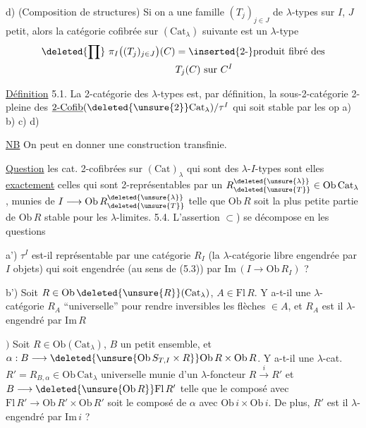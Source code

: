 d)  (Composition de structures) Si on a une
famille $(T_j)_{j\in J}$ de $\lambda$-types sur $I$, $J$ petit,
 alors la catégorie cofibrée sur $(\mathrm{Cat}_{\lambda})$
suivante est un $\lambda$-type
\[
\begin{aligned}
\deleted{\prod}\ \pi_I\bigl((T_j)_{j\in J}\bigr)(C)&=\inserted{2\text{-}}\text{produit fibré des}\\
&T_j(C)\text{ sur }C^I
\end{aligned}
\]

\uline{Définition} 5.1. La 2-catégorie des $\lambda$-types est, par définition,
la sous-2-catégorie 2-pleine des  $\underline{2\text{-}\mathrm{Cofib}}(\deleted{\unsure{2}}\mathrm{Cat}_\lambda)/\tau^I$
  qui soit stable par
les op a) b) c) d)

\uline{NB} On peut en donner une construction transfinie.

\uline{Question}   les cat. 2-cofibrées sur $(\mathrm{Cat})_\lambda$ qui
sont des $\lambda$-$I$-types sont elles \uline{exactement} celles qui
sont 2-représentables par un $R_{\deleted{\unsure{T}}}^{\deleted{\unsure{\lambda}}}\in\mathrm{Ob}\,\mathrm{Cat}_\lambda$, munies
de $I\longrightarrow\mathrm{Ob}\,R_{\deleted{\unsure{T}}}^{\deleted{\unsure{\lambda}}}$ telle que  $\mathrm{Ob}\,R$
soit la plus petite partie de $\mathrm{Ob}\,R$ stable pour les $\lambda$-limites.
5.4. L'assertion $\subset$)
 se décompose en les questions

a') $\tau^I$ est-il représentable par une catégorie $R_I$ (la
$\lambda$-catégorie libre engendrée par $I$ objets) qui soit \inserted{$\lambda$-}engendrée
(au sens de (5.3)) par $\mathrm{Im}\,(I\longrightarrow\mathrm{Ob}\,R_I)$ ?

b') Soit  $R\in\mathrm{Ob}\,\deleted{\unsure{R}}(\mathrm{Cat}_\lambda)$, $A\in\mathrm{Fl}\,R$. Y a-t-il une
$\lambda$-catégorie $R_A$  ``universelle'' pour rendre inversibles les
flèches $\in A$, et $R_A$ est il $\lambda$-engendré par $\mathrm{Im}\,R$

$)$ Soit $R\in\mathrm{Ob}(\mathrm{Cat}_{\lambda})$, $B$ un  petit ensemble, et
$\alpha:B\longrightarrow\deleted{\unsure{\mathrm{Ob}\,S_{T,I}\times R}}\mathrm{Ob}\,R\times\mathrm{Ob}\,R$.  Y a-t-il une
$\lambda$-cat. $R'=R_{B,\alpha}\in\mathrm{Ob}\,\mathrm{Cat}_{\lambda}$ universelle  munie
d'un $\lambda$-foncteur $R\xrightarrow{i}R'$ et 
$B\longrightarrow\deleted{\unsure{\mathrm{Ob}\,R}}\mathrm{Fl}\,R'$ telle que le composé avec $\mathrm{Fl}\,R'\to\mathrm{Ob}\,R'\times\mathrm{Ob}\,R'$
soit le composé de $\alpha$ avec $\mathrm{Ob}\,i\times\mathrm{Ob}\,i$. De plus, $R'$ est il
$\lambda$-engendré par $\mathrm{Im}\,i$ ?

